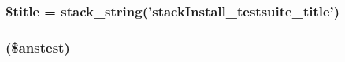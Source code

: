 \hypertarget{answertests_8php_ada57e7bb7c152edad18fe2f166188691}{
\subsubsection[{\$title}]{\setlength{\rightskip}{0pt plus 5cm}\$title = stack\_\-string('stackInstall\_\-testsuite\_\-title')}}
\label{answertests_8php_ada57e7bb7c152edad18fe2f166188691}
\hypertarget{answertests_8php_a8685f62ef2250e3df3ffb6a8c32e5ffa}{
\subsubsection[{if}]{(\$anstest)}}
\label{answertests_8php_a8685f62ef2250e3df3ffb6a8c32e5ffa}
